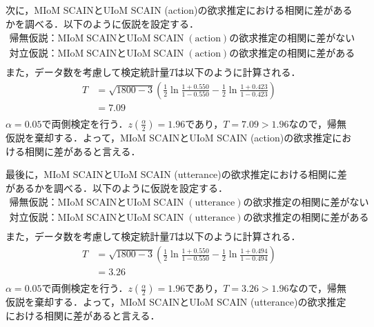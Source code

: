 \par
次に，MIoM SCAINとUIoM SCAIN (action)の欲求推定における相関に差があるかを調べる．以下のように仮説を設定する．
\begin{displaymath}
  \begin{split}
  \label{z_a_b}
  \mathrm{帰無仮説：MIoM\; SCAINとUIoM\; SCAIN\; (action)の欲求推定の相関に差がない}\\
  \mathrm{対立仮説：MIoM\; SCAINとUIoM\; SCAIN\; (action)の欲求推定の相関に差がある}\\
  \end{split}
\end{displaymath}
また，データ数を考慮して検定統計量$T$は以下のように計算される．
\begin{displaymath}
  \begin{split}
  \label{z_a_b}
  T&=\sqrt{1800-3}\left(\frac{1}{2}\ln{\frac{1+0.550}{1-0.550}-\frac{1}{2}\ln{\frac{1+0.423}{1-0.423}}}\right)\\
  &=7.09\\
  \end{split}
\end{displaymath}
$\alpha=0.05$で両側検定を行う．$z\left(\frac{\alpha}{2}\right)=1.96$であり，$T=7.09>1.96$なので，帰無仮説を棄却する．よって，MIoM SCAINとUIoM SCAIN (action)の欲求推定における相関に差があると言える．

\par
最後に，MIoM SCAINとUIoM SCAIN (utterance)の欲求推定における相関に差があるかを調べる．以下のように仮説を設定する．
\begin{displaymath}
  \begin{split}
  \label{z_a_b}
  \mathrm{帰無仮説：MIoM\; SCAINとUIoM\; SCAIN\; (utterance)の欲求推定の相関に差がない}\\
  \mathrm{対立仮説：MIoM\; SCAINとUIoM\; SCAIN\; (utterance)の欲求推定の相関に差がある}\\
  \end{split}
\end{displaymath}
また，データ数を考慮して検定統計量$T$は以下のように計算される．
\begin{displaymath}
  \begin{split}
  \label{z_a_b}
  T&=\sqrt{1800-3}\left(\frac{1}{2}\ln{\frac{1+0.550}{1-0.550}-\frac{1}{2}\ln{\frac{1+0.494}{1-0.494}}}\right)\\
  &=3.26\\
  \end{split}
\end{displaymath}
$\alpha=0.05$で両側検定を行う．$z\left(\frac{\alpha}{2}\right)=1.96$であり，$T=3.26>1.96$なので，帰無仮説を棄却する．よって，MIoM SCAINとUIoM SCAIN (utterance)の欲求推定における相関に差があると言える．


